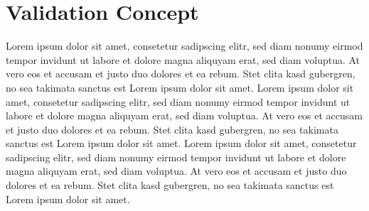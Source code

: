 \section{Validation Concept}
Lorem ipsum dolor sit amet, consetetur sadipscing elitr, sed diam nonumy eirmod tempor invidunt ut labore et dolore magna aliquyam erat, sed diam voluptua.
At vero eos et accusam et justo duo dolores et ea rebum. Stet clita kasd gubergren, no sea takimata sanctus est Lorem ipsum dolor sit amet.
Lorem ipsum dolor sit amet, consetetur sadipscing elitr, sed diam nonumy eirmod tempor invidunt ut labore et dolore magna aliquyam erat, sed diam voluptua.
At vero eos et accusam et justo duo dolores et ea rebum. Stet clita kasd gubergren, no sea takimata sanctus est Lorem ipsum dolor sit amet.
Lorem ipsum dolor sit amet, consetetur sadipscing elitr, sed diam nonumy eirmod tempor invidunt ut labore et dolore magna aliquyam erat, sed diam voluptua.
At vero eos et accusam et justo duo dolores et ea rebum. Stet clita kasd gubergren, no sea takimata sanctus est Lorem ipsum dolor sit amet.